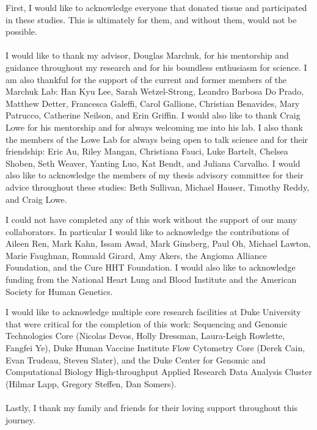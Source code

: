 \acknowledgements
First, I would like to acknowledge everyone that donated tissue and participated in these studies. This is ultimately for them, and without them, would not be possible. 
\\ \\
I would like to thank my advisor, Douglas Marchuk, for his mentorship and guidance throughout my research and for his boundless enthusiasm for science. I am also thankful for the support of the current and former members of the Marchuk Lab: Han Kyu Lee, Sarah Wetzel-Strong, Leandro Barbosa Do Prado, Matthew Detter, Francesca Galeffi, Carol Gallione, Christian Benavides, Mary Patrucco, Catherine Neilson, and Erin Griffin. I would also like to thank Craig Lowe for his mentorship and for always welcoming me into his lab. I also thank the members of the Lowe Lab for always being open to talk science and for their friendship: Eric Au, Riley Mangan, Christiana Fauci, Luke Bartelt, Chelsea Shoben, Seth Weaver, Yanting Luo, Kat Bendt, and Juliana Carvalho. I would also like to acknowledge the members of my thesis advisory committee for their advice throughout these studies: Beth Sullivan, Michael Hauser, Timothy Reddy, and Craig Lowe. 

I could not have completed any of this work without the support of our many collaborators. In particular I would like to acknowledge the contributions of Aileen Ren, Mark Kahn, Issam Awad, Mark Ginsberg, Paul Oh, Michael Lawton, Marie Faughnan, Romuald Girard, Amy Akers, the Angioma Alliance Foundation, and the Cure HHT Foundation. I would also like to acknowledge funding from the National Heart Lung and Blood Institute and the American Society for Human Genetics.

I would like to acknowledge multiple core research facilities at Duke University that were critical for the completion of this work: Sequencing and Genomic Technologies Core (Nicolas Devos, Holly Dressman, Laura-Leigh Rowlette, Fangfei Ye), Duke Human Vaccine Institute Flow Cytometry Core (Derek Cain, Evan Trudeau, Steven Slater), and the Duke Center for Genomic and Computational Biology High-throughput Applied Research Data Analysis Cluster (Hilmar Lapp, Gregory Steffen, Dan Somers). 
\\ \\
Lastly, I thank my family and friends for their loving support throughout this journey. 